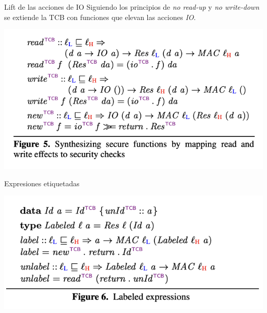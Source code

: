 \documentclass{beamer}
\begin{document}
\begin{frame}{Lift de las acciones de IO}
    Siguiendo los principios de \textit{no read-up} y \textit{no write-down} se extiende la TCB con funciones que elevan las acciones \textit{IO}.

    \begin{center}
        \includegraphics[scale=0.7]{figure5.png}
    \end{center}
\end{frame}

\begin{frame}{Expresiones etiquetadas}
    \begin{center}
        \includegraphics[scale=0.8]{figure6.png}
    \end{center}
\end{frame}
\end{document}
